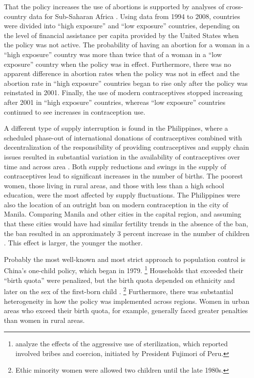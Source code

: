 \documentclass[letterpaper,12pt]{article}
\begin{document}
That the policy increases the use of abortions is supported by analyses
of cross-country data for Sub-Saharan Africa \citep{Bendavid2011}. 
Using data from 1994 to 2008, countries were divided into ``high
exposure'' and ``low exposure'' countries, depending on the level of
financial assistance per capita provided by the United States when the
policy was not active. 
The probability of having an abortion for a woman in a ``high exposure''
country was more than twice that of a woman in a ``low exposure''
country when the policy was in effect. 
Furthermore, there was no apparent difference in abortion rates when the
policy was not in effect and the abortion rate in ``high exposure''
countries began to rise only after the policy was reinstated in 2001. 
Finally, the use of modern contraceptives stopped increasing after 2001
in ``high exposure'' countries, whereas ``low exposure'' countries
continued to see increases in contraception use.

A different type of supply interruption is found in the Philippines,
where a scheduled phase-out of international donations of contraceptives
combined with decentralization of the responsibility of providing
contraceptives and supply chain issues resulted in substantial variation
in the availability of contraceptives over time and across area
\citep{Salas2014}. 
Both supply reductions and swings in the supply of contraceptives lead
to significant increases in the number of births. 
The poorest women, those living in rural areas, and those with less than
a high school education, were the most affected by supply fluctuations. 
The Philippines were also the location of an outright ban on modern
contraception in the city of Manila. 
Comparing Manila and other cities in the capital region, and assuming
that these cities would have had similar fertility trends in the absence
of the ban, the ban resulted in an approximately 3 percent increase in
the number of children \citep{Dumas2017}. 
This effect is larger, the younger the mother.

Probably the most well-known and most strict approach to population
control is China's one-child policy, which began in 1979.%
\footnote{
\citet{Byker2012} analyze the effects of the aggressive use of
sterilization, which reported involved bribes and coercion, initiated by
President Fujimori of Peru.} 
Households that exceeded their ``birth quota'' were penalized, but the
birth quota depended on ethnicity and later on the sex of the first-born
child \citep{Li2005}.%
\footnote{
Ethic minority women were allowed two children until the late 1980s.} 
Furthermore, there was substantial heterogeneity in how the policy was
implemented across regions. 
Women in urban areas who exceed their birth quota, for example,
generally faced greater penalties than women in rural areas.
\end{document}
